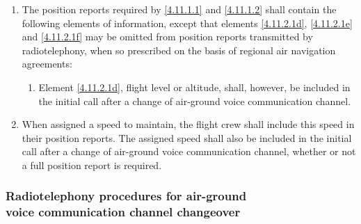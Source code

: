 \documentclass[../vATM.tex]{subfiles}
\begin{document}
    \begin{enumerate}
        \item The position reports required by \ref{4.11.1.1} and \ref{4.11.1.2} shall contain the following elements of information, except that elements \ref{4.11.2.1d}, \ref{4.11.2.1e} and \ref{4.11.2.1f} may be omitted from position reports transmitted by radiotelephony, when so prescribed on the basis of regional air navigation agreements:


        \begin{enumerate}
            \item Element \ref{4.11.2.1d}, flight level or altitude, shall, however, be included in the initial call after a change of air-ground voice communication channel.
        \end{enumerate}

        \item When assigned a speed to maintain, the flight crew shall include this speed in their position reports. The assigned speed shall also be included in the initial call after a change of air-ground voice communication channel, whether or not a full position report is required.
    \end{enumerate}

    \subsubsection[Radiotelephony procedures for air-ground voice communication channel changeover]{Radiotelephony procedures for air-ground \\ voice communication channel changeover} \label{4.11.3}
\end{document}
